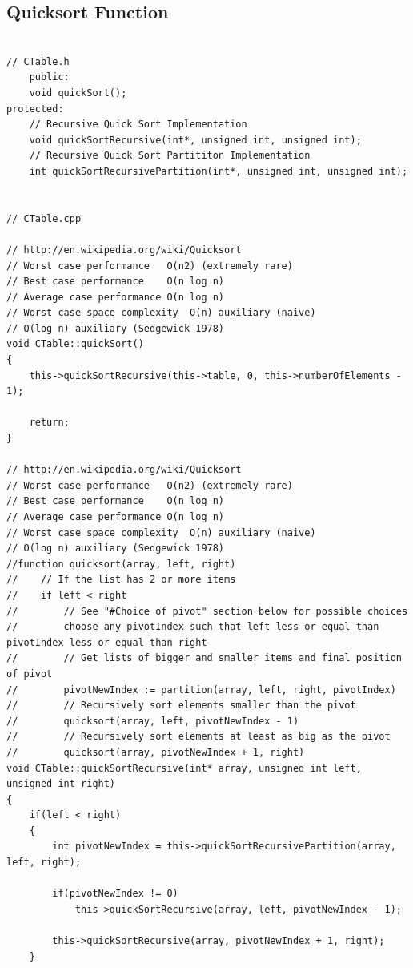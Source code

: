 \documentclass{article}
\begin{document}
	\subsection{Quicksort Function}
	\begin{lstlisting}[label=CTable-quicksort, caption=Quick Sort]
	
// CTable.h
	public:
    void quickSort();
protected:
    // Recursive Quick Sort Implementation
    void quickSortRecursive(int*, unsigned int, unsigned int);
    // Recursive Quick Sort Partititon Implementation
    int quickSortRecursivePartition(int*, unsigned int, unsigned int);
    
    
// CTable.cpp
    
// http://en.wikipedia.org/wiki/Quicksort
// Worst case performance	O(n2) (extremely rare)
// Best case performance	O(n log n)
// Average case performance	O(n log n)
// Worst case space complexity	O(n) auxiliary (naive)
// O(log n) auxiliary (Sedgewick 1978)
void CTable::quickSort()
{
    this->quickSortRecursive(this->table, 0, this->numberOfElements - 1);

    return;
}

// http://en.wikipedia.org/wiki/Quicksort
// Worst case performance	O(n2) (extremely rare)
// Best case performance	O(n log n)
// Average case performance	O(n log n)
// Worst case space complexity	O(n) auxiliary (naive)
// O(log n) auxiliary (Sedgewick 1978)
//function quicksort(array, left, right)
//    // If the list has 2 or more items
//    if left < right
//        // See "#Choice of pivot" section below for possible choices
//        choose any pivotIndex such that left less or equal than pivotIndex less or equal than right
//        // Get lists of bigger and smaller items and final position of pivot
//        pivotNewIndex := partition(array, left, right, pivotIndex)
//        // Recursively sort elements smaller than the pivot
//        quicksort(array, left, pivotNewIndex - 1)
//        // Recursively sort elements at least as big as the pivot
//        quicksort(array, pivotNewIndex + 1, right)
void CTable::quickSortRecursive(int* array, unsigned int left, unsigned int right)
{
    if(left < right)
    {
        int pivotNewIndex = this->quickSortRecursivePartition(array, left, right);

        if(pivotNewIndex != 0)
            this->quickSortRecursive(array, left, pivotNewIndex - 1);

        this->quickSortRecursive(array, pivotNewIndex + 1, right);
    }


\end{lstlisting}
\end{document}
